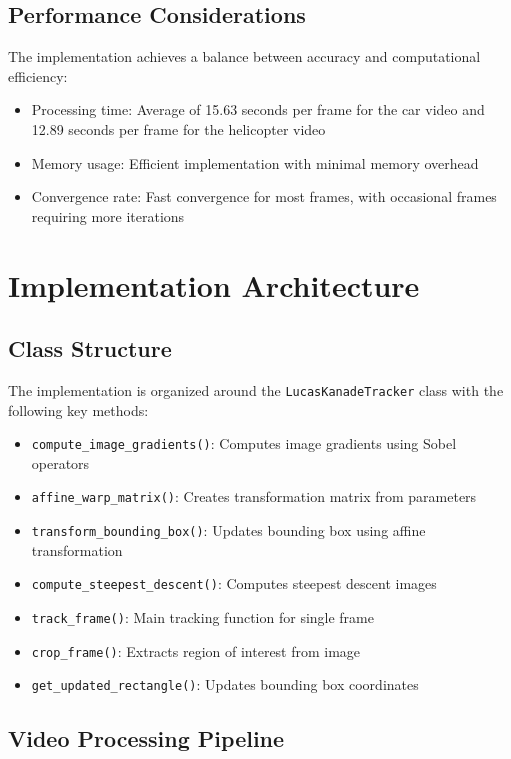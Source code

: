 \documentclass[12pt,a4paper]{article}
\begin{document}
\subsection{Performance Considerations}

The implementation achieves a balance between accuracy and computational efficiency:

\begin{itemize}
\item Processing time: Average of 15.63 seconds per frame for the car video and 12.89 seconds per frame for the helicopter video
\item Memory usage: Efficient implementation with minimal memory overhead
\item Convergence rate: Fast convergence for most frames, with occasional frames requiring more iterations
\end{itemize}

\section{Implementation Architecture}

\subsection{Class Structure}

The implementation is organized around the \texttt{LucasKanadeTracker} class with the following key methods:

\begin{itemize}
\item \texttt{compute\_image\_gradients()}: Computes image gradients using Sobel operators
\item \texttt{affine\_warp\_matrix()}: Creates transformation matrix from parameters
\item \texttt{transform\_bounding\_box()}: Updates bounding box using affine transformation
\item \texttt{compute\_steepest\_descent()}: Computes steepest descent images
\item \texttt{track\_frame()}: Main tracking function for single frame
\item \texttt{crop\_frame()}: Extracts region of interest from image
\item \texttt{get\_updated\_rectangle()}: Updates bounding box coordinates
\end{itemize}

\subsection{Video Processing Pipeline}
\end{document}
